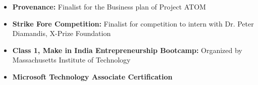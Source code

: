 \begin{itemize}
 \item \textbf{Provenance:} Finalist for the Business plan of Project ATOM
 \item \textbf{Strike Fore Competition:} Finalist for competition to intern with Dr. Peter Diamandis, X-Prize Foundation
 \item \textbf{Class 1, Make in India Entrepreneurship Bootcamp:} Organized by Massachusetts Institute of Technology
 \item \textbf{Microsoft Technology Associate Certification} 
\end{itemize}